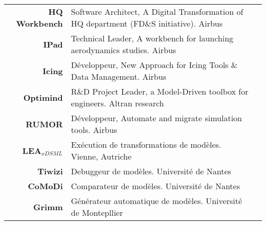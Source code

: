 
\begin{tabular}{r @{~$\rangle$~} p{} l}

\textbf{HQ Workbench} & Software Architect, A Digital Transformation of HQ department (FD\&S initiative). Airbus \\

\textbf{IPad} & Technical Leader, A workbench for launching aerodynamics studies. Airbus \\

\textbf{Icing} & Développeur, New Approach for Icing Tools \& Data Management. Airbus \\

\textbf{Optimind} & R\&D Project Leader, a Model-Driven toolbox for engineers. Altran research \\

\textbf{RUMOR} & Développeur, Automate and migrate simulation tools. Airbus \\

\textbf{LEA$_{xDSML}$} & Exécution de transformations de modèles. Vienne, Autriche \\
 
\textbf{Tiwizi} & Debuggeur de modèles. Université de Nantes \\

\textbf{CoMoDi} & Comparateur de modèles. Université de Nantes \\

\textbf{Grimm} & Générateur automatique de modèles. Université de Montepllier \\

\end{tabular}